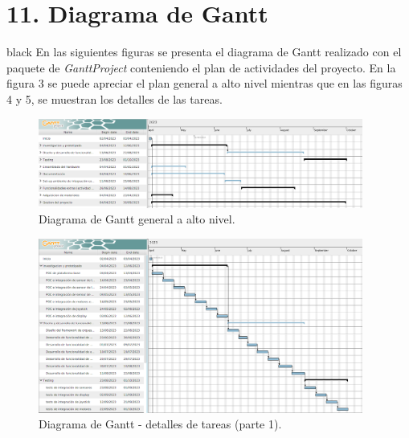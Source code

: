 \documentclass[
11pt, %
]{charter}
\begin{document}
\section{11. Diagrama de Gantt}
\label{sec:gantt}

\begin{consigna}{black}
En las siguientes figuras se presenta el diagrama de Gantt realizado con el paquete de \textit{GanttProject} conteniendo el plan de actividades del proyecto. En la figura 3 se puede apreciar el plan general a alto nivel mientras que en las figuras 4 y 5, se muestran los detalles de las tareas. 

\begin{figure}[htpb]
\centering 
\includegraphics[width=0.95\textwidth]{./Figuras/gantt-part-0.png}
\caption{Diagrama de Gantt general a alto nivel.}
\label{fig:diagGantt}
\end{figure}

\begin{figure}[htpb]
\centering 
\includegraphics[width=0.95\textwidth]{./Figuras/gantt-part-1.png}
\caption{Diagrama de Gantt - detalles de tareas (parte 1).}
\label{fig:diagGantt}
\end{figure}


\end{consigna}
\end{document}
